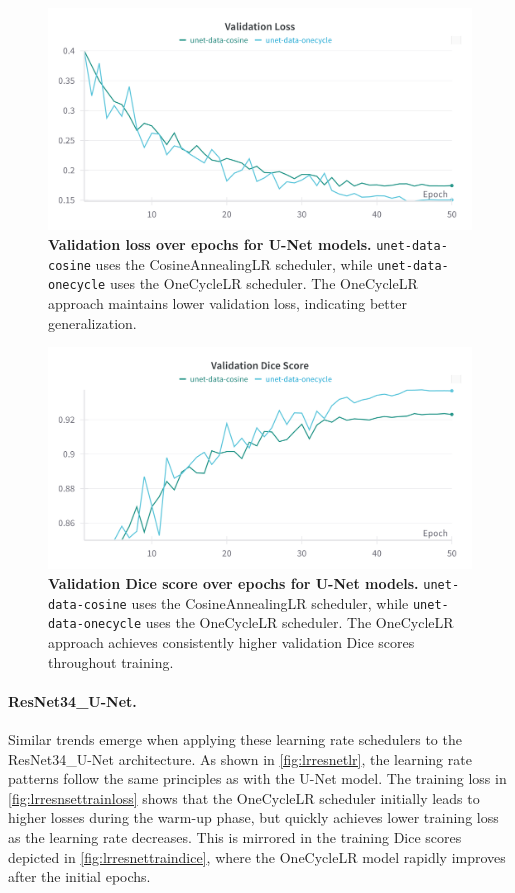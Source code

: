 \documentclass[twocolumn,a4paper]{article}
\begin{document}
\begin{figure}[H]
\centering
\includegraphics[width=0.95\linewidth]{figs/lr_unet_val_loss}
\caption{\textbf{Validation loss over epochs for U-Net models.} \texttt{unet-data-cosine} uses the CosineAnnealingLR scheduler, while \texttt{unet-data-onecycle} uses the OneCycleLR scheduler. The OneCycleLR approach maintains lower validation loss, indicating better generalization.}
\label{fig:lrunetvalloss}
\end{figure}
\begin{figure}[H]
\centering
\includegraphics[width=0.95\linewidth]{figs/lr_unet_val_dice}
\caption{\textbf{Validation Dice score over epochs for U-Net models.} \texttt{unet-data-cosine} uses the CosineAnnealingLR scheduler, while \texttt{unet-data-onecycle} uses the OneCycleLR scheduler. The OneCycleLR approach achieves consistently higher validation Dice scores throughout training.}
\label{fig:lrunetvaldice}
\end{figure}

\paragraph{ResNet34\_U-Net.} Similar trends emerge when applying these learning rate schedulers to the ResNet34\_U-Net architecture. As shown in \autoref{fig:lrresnetlr}, the learning rate patterns follow the same principles as with the U-Net model. The training loss in \autoref{fig:lrresnsettrainloss} shows that the OneCycleLR scheduler initially leads to higher losses during the warm-up phase, but quickly achieves lower training loss as the learning rate decreases. This is mirrored in the training Dice scores depicted in \autoref{fig:lrresnettraindice}, where the OneCycleLR model rapidly improves after the initial epochs.
\end{document}
